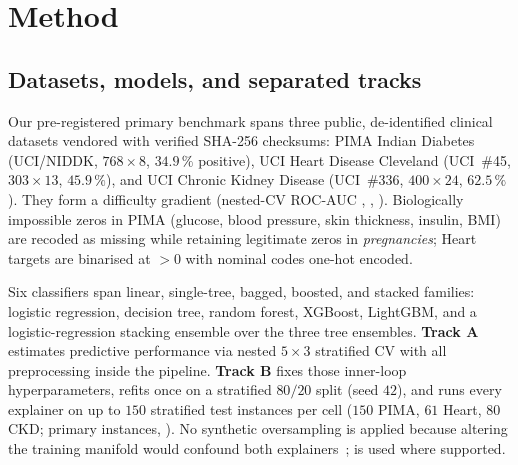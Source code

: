 \section{Method}\label{sec:method}

\subsection{Datasets, models, and separated tracks}\label{sec:method-data}
Our pre-registered primary benchmark spans three public, de-identified clinical datasets
vendored with verified SHA-256 checksums: PIMA Indian Diabetes (UCI/NIDDK, $768\times 8$,
$34.9\,\%$ positive), UCI Heart Disease Cleveland (UCI~\#45, $303\times 13$, $45.9\,\%$),
and UCI Chronic Kidney Disease (UCI~\#336, $400\times 24$, $62.5\,\%$). They form a
difficulty gradient (nested-CV ROC-AUC \AucPima{}, \AucHeart{}, \AucCkd{}). Biologically
impossible zeros in PIMA (glucose, blood pressure, skin thickness, insulin, BMI) are
recoded as missing while retaining legitimate zeros in \emph{pregnancies}; Heart targets
are binarised at $>0$ with nominal codes one-hot encoded. 

Six classifiers span linear, single-tree, bagged, boosted, and stacked families: logistic
regression, decision tree, random forest, XGBoost, LightGBM, and a logistic-regression
stacking ensemble over the three tree ensembles. \textbf{Track A} estimates predictive
performance via nested $5\times 3$ stratified CV with all preprocessing inside the
pipeline. \textbf{Track B} fixes those inner-loop hyperparameters, refits once on a
stratified $80/20$ split (seed $42$), and runs every explainer on up to $150$ stratified
test instances per cell ($150$ PIMA, $61$ Heart, $80$ CKD; \NumExplained{} primary
instances, ). No
synthetic oversampling is applied because altering the training manifold would confound
both explainers~;  is used where
supported.

